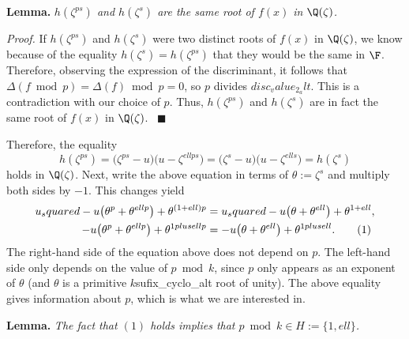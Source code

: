 \textbf{Lemma.} \emph{$h(\zeta^{ps})$ and $h(\zeta^{s})$ are the same root of $f(x)$ in $\Q(\zeta)$.}

\textit{Proof.} If $h(\zeta^{ps})$ and $h(\zeta^{s})$ were two distinct roots of $f(x)$ in $\Q(\zeta)$, we know because of the equality $h(\zeta^{s})=h(\zeta^{ps})$ that they would be the same in $\F$. Therefore, observing the expression of the discriminant, it follows that $\Delta(f \bmod{p})=\Delta(f) \bmod{p}=0$, so $p$ divides ${disc_value_2_alt}$. This is a contradiction with our choice of $p$. Thus, $h(\zeta^{ps})$ and $h(\zeta^{s})$ are in fact the same root of $f(x)$ in $\Q(\zeta)$. \ $\blacksquare$

Therefore, the equality
\begin{equation*}
h(\zeta^{ps})=\big(\zeta^{ps}-{u}\big)\big({{u}}-\zeta^{{ell}ps}\big)=\big(\zeta^{s}-{u}\big)\big({{u}}-\zeta^{{ell}s}\big)=h(\zeta^{s})
\end{equation*}
holds in $\Q(\zeta)$. Next, write the above equation in terms of $\theta:=\zeta^{s}$ and multiply both sides by $-1$. This changes yield
\begin{align}
{u_squared}-{{u}}\big(\theta^{p}+\theta^{{ell}p}\big)+\theta^{(1+{ell})p}&={u_squared}-{{u}}\big(\theta+\theta^{{ell}}\big)+\theta^{1+{ell}}, \notag \\
-{u}\big(\theta^{p}+\theta^{{ell}p}\big)+\theta^{{1plusell}p}&=-{u}\big(\theta+\theta^{{ell}}\big)+\theta^{{1plusell}}. \quad \quad (1)
\end{align}
The right-hand side of the equation above does not depend on $p$. The left-hand side only depends on the value of $p\bmod{{k}}$, since $p$ only appears as an exponent of $\theta$ (and $\theta$ is a primitive ${k}${sufix_cyclo_alt} root of unity). The above equality gives information about $p$, which is what we are interested in. 

\textbf{Lemma.} \emph{The fact that $(1)$ holds implies that $p \bmod{{k}}\in H:=\{1,{ell}\}$.}

